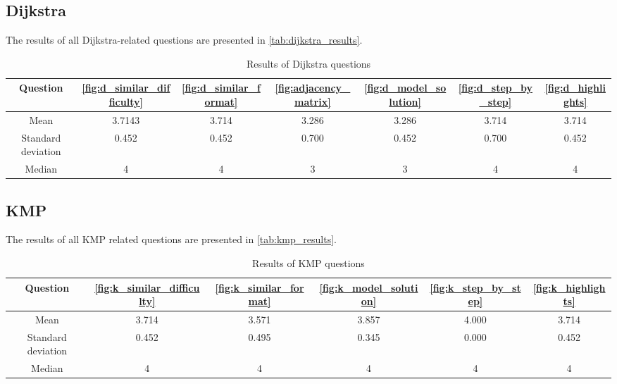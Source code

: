 \documentclass{l4proj}
\begin{document}
\subsection{Dijkstra}
\label{sec:d_results}

The results of all Dijkstra-related questions are presented in \autoref{tab:dijkstra_results}.

\begin{table}[h]
\begin{center}
\begin{tabular}{| c || c | c | c | c | c | c |}
	\hline
	Question & \ref{fig:d_similar_difficulty} & \ref{fig:d_similar_format} & \ref{fig:adjacency_matrix} & \ref{fig:d_model_solution} & \ref{fig:d_step_by_step} & \ref{fig:d_highlights} \\
	\hline
	\hline
	Mean & 3.7143 & 3.714 & 3.286 & 3.286 & 3.714 & 3.714 \\
	\hline
	Standard deviation & 0.452 & 0.452 & 0.700 & 0.452 & 0.700 & 0.452 \\
	\hline
	Median & 4 & 4 & 3 & 3 & 4 & 4 \\
	\hline
\end{tabular}
\caption{\label{tab:dijkstra_results} Results of Dijkstra questions}
\end{center}
\end{table}

\subsection{KMP}
\label{sec:k_results}

The results of all KMP related questions are presented in \autoref{tab:kmp_results}.

\begin{table}[h]
\begin{center}
\begin{tabular}{| c || c | c | c | c | c |}
	\hline
	Question & \ref{fig:k_similar_difficulty} & \ref{fig:k_similar_format} & \ref{fig:k_model_solution} & \ref{fig:k_step_by_step} & \ref{fig:k_highlights} \\
	\hline
	\hline
	Mean & 3.714 & 3.571 & 3.857 & 4.000 & 3.714 \\
	\hline
	Standard deviation & 0.452 & 0.495 & 0.345 & 0.000 & 0.452 \\
	\hline
	Median & 4 & 4 & 4 & 4 & 4 \\
	\hline
\end{tabular}
\caption{\label{tab:kmp_results} Results of KMP questions}
\end{center}
\end{table}
\end{document}
